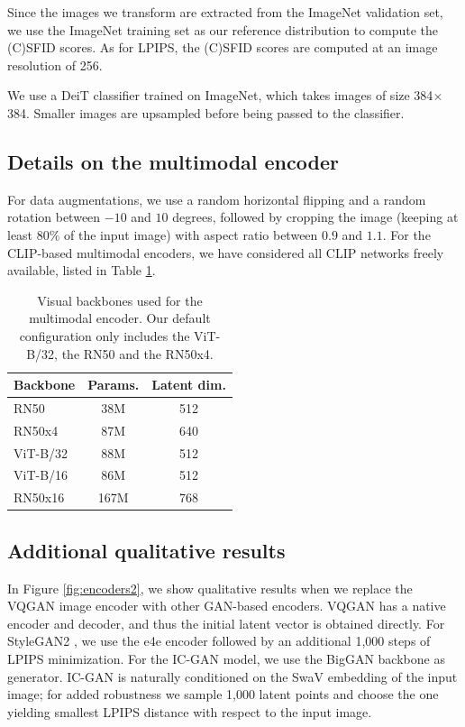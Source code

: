 Since the images we transform are extracted from the ImageNet validation set, we use the ImageNet training set as our reference distribution to compute the (C)SFID scores. 
As for LPIPS, the (C)SFID scores are computed at an image resolution of 256.

 We use a DeiT classifier \cite{touvron20arxiv2} trained on ImageNet, which takes images of size 384$\times$384. Smaller images are upsampled before being passed to the classifier.


\subsection{Details on the multimodal encoder}


For data augmentations, we use a random horizontal flipping and a random rotation between $-10$ and $10$ degrees, followed by cropping the image (keeping at least $80\%$ of the input image) with aspect ratio between $0.9$ and $1.1$.
For the CLIP-based multimodal encoders, we have considered all CLIP networks freely available,  listed in Table \ref{tab:clip}.

\begin{table}[H]
\center
\begin{tabular}{lcc}
\toprule
\textbf{Backbone} & \textbf{Params.} & \textbf{Latent dim.}\\
\midrule
RN50 & 38M & 512\\
RN50x4 & 87M & 640\\
ViT-B/32 & 88M & 512\\
ViT-B/16 & 86M & 512 \\
RN50x16 & 167M & 768\\
\bottomrule
\end{tabular}
\caption{Visual backbones used for the multimodal encoder. Our default configuration only includes the ViT-B/32, the RN50 and the RN50x4.}
\label{tab:clip}
\end{table}


\subsection{Additional qualitative results}


In Figure \ref{fig:encoders2}, we show qualitative results when we replace the VQGAN image encoder with other GAN-based encoders. VQGAN has a native encoder and decoder, and thus the initial latent vector is obtained directly. For StyleGAN2 \cite{karras20cvpr}, we use the e4e encoder \cite{tov2021designing} followed by an additional 1,000 steps of LPIPS minimization. For the IC-GAN \cite{casanova21nips} model, we use the BigGAN \cite{brock19iclr} backbone as generator. IC-GAN is naturally conditioned on the SwaV embedding \cite{caron20nips} of the input image; for added robustness we sample 1,000 latent points and choose the one yielding smallest LPIPS distance with respect to the input image. 

